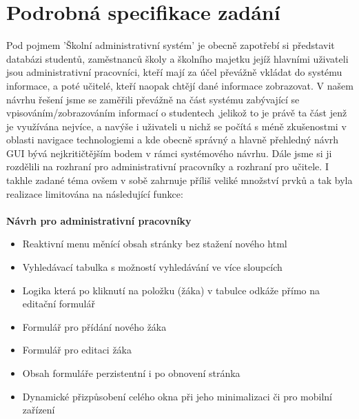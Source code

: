 \documentclass[a4paper, 11pt, twocolumn]{article}
\begin{document}
	\section*{\large{Podrobná specifikace zadání}}
	\vspace*{-0.2cm}
	Pod pojmem 'Školní administrativní systém' je obecně zapotřebí si představit databázi studentů, zaměstnanců školy a školního majetku jejíž hlavními 
	uživateli jsou administrativní pracovníci, kteří mají za účel převážně vkládat do systému informace, a poté učitelé, kteří naopak chtějí dané informace 
	zobrazovat. V našem návrhu řešení jsme se zaměřili převážně na část systému zabývající se vpisováním/zobrazováním informací o studentech ,jelikož to je 
	právě ta část jenž je využívána nejvíce, a navýše i uživateli u nichž se počítá s méně zkušenostmi v oblasti navigace technologiemi a kde obecně správný a 
	hlavně přehledný návrh GUI bývá nejkritičtějším bodem v rámci systémového návrhu. Dále jsme si ji rozdělili na rozhraní pro administrativní pracovníky a 
	rozhraní pro učitele. I takhle zadané téma ovšem v sobě zahrnuje příliš veliké množství prvků a tak byla realizace limitována na následující funkce: \\
	\vspace*{0.2cm} \\
	\noindent\textbf{Návrh pro administrativní pracovníky} 
	\begin{itemize}
		\item Reaktivní menu měnící obsah stránky bez stažení nového html
		\vspace{-0.2cm}
		\item Vyhledávací tabulka s možností vyhledávání ve více sloupcích
		\vspace{-0.2cm}
		\item Logika která po kliknutí na položku (žáka) v tabulce odkáže přímo na editační formulář
		\vspace{-0.2cm}
		\item Formulář pro přídání nového žáka
		\vspace{-0.2cm}
		\item Formulář pro editaci žáka
		\vspace{-0.2cm}
		\item Obsah formuláře perzistentní i po obnovení stránka
		\vspace{-0.2cm}
		\item Dynamické přizpůsobení celého okna při jeho minimalizaci či pro mobilní zařízení
	\end{itemize}
	\vspace*{0.2cm}
\end{document}
